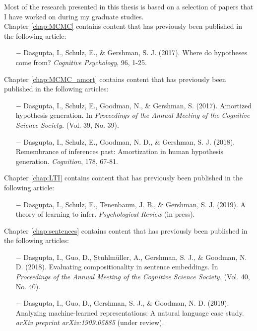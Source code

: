 
{\setlength{\parindent}{0em}
Most of the research presented in this thesis is based on a selection of papers that I have worked on during my graduate studies.\\

Chapter \ref{chap:MCMC} contains content that has previously been published in the following article: 
\vspace{-10pt}
\begin{itemize}
    \item[$-$] Dasgupta, I., Schulz, E., \& Gershman, S. J. (2017). Where do hypotheses come from? \textit{Cognitive Psychology}, 96, 1-25.
\end{itemize}


Chapter \ref{chap:MCMC_amort} contains content that has previously been published in the following articles:  
\vspace{-10pt}
\begin{itemize}
    \item[$-$]Dasgupta, I., Schulz, E., Goodman, N., \& Gershman, S. (2017). Amortized hypothesis generation.  In \textit{Proceedings of the Annual Meeting of the Cognitive Science Society.} (Vol. 39, No. 39).
    \vspace{-10pt}
    \item[$-$]Dasgupta, I., Schulz, E., Goodman, N. D., \& Gershman, S. J. (2018). Remembrance of inferences past: Amortization in human hypothesis generation. \textit{Cognition}, 178, 67-81.
\end{itemize}

Chapter \ref{chap:LTI} contains content that has previously been published in the following article: 
\vspace{-10pt}
\begin{itemize}
    \item[$-$]Dasgupta, I., Schulz, E., Tenenbaum, J. B., \& Gershman, S. J. (2019). A theory of learning to infer.  \textit{Psychological Review} (in press).
    \end{itemize}


Chapter \ref{chap:sentences} contains content that has previously been published in the following articles: 
\vspace{-10pt}
\begin{itemize}
    \item[$-$]Dasgupta, I., Guo, D., Stuhlmüller, A., Gershman, S. J., \& Goodman, N. D. (2018). Evaluating compositionality in sentence embeddings. In \textit{Proceedings of the Annual Meeting of the Cognitive Science Society.} (Vol. 40, No. 40). 
        \vspace{-10pt}
    \item[$-$] Dasgupta, I., Guo, D., Gershman, S. J., \& Goodman, N. D. (2019). Analyzing machine-learned representations: A natural language case study. \textit{arXiv preprint arXiv:1909.05885} (under review).
    \end{itemize}


}

